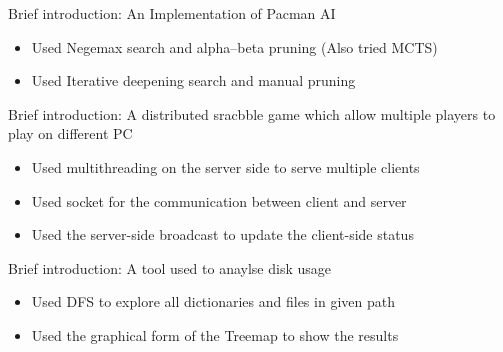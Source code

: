 \documentclass{resume}
\begin{document}
Brief introduction: An Implementation of Pacman AI
\begin{itemize}
  \item Used Negemax search and alpha–beta pruning (Also tried MCTS)
  \item Used Iterative deepening search and manual pruning
\end{itemize}


Brief introduction: A distributed sracbble game which allow multiple players to play on different PC
\begin{itemize}
  \item Used multithreading on the server side to serve multiple clients
  \item Used socket for the communication between client and server
  \item Used the server-side broadcast to update the client-side status
\end{itemize}




Brief introduction: A tool used to anaylse disk usage
\begin{itemize}
  \item Used DFS to explore all dictionaries and files in given path
  \item Used the graphical form of the Treemap to show the results
\end{itemize}
\end{document}
